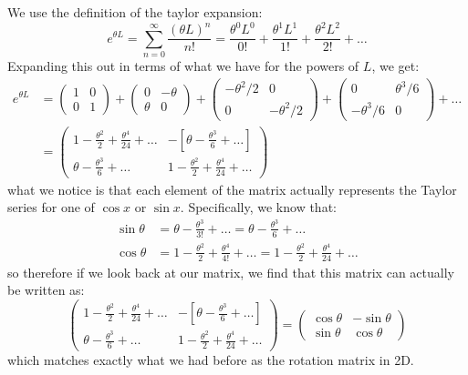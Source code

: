 \documentclass{article}
\begin{document}
\begin{solution}
	We use the definition of the taylor expansion:
	\[
		e^{\theta L} = \sum_{n=0}^\infty \frac{(\theta L)^n}{n!} = \frac{\theta^0 L^0}{0!} + \frac{\theta^1 L^1}{1!} + \frac{\theta^2L^2}{2!} + \dots
	\] 
	Expanding this out in terms of what we have for the powers of $L$, we get:
	\begin{align*}
		e^{\theta L} &= \begin{pmatrix} 1 & 0\\0&1 \end{pmatrix} + 
		\begin{pmatrix} 0 & -\theta \\ \theta & 0 \end{pmatrix} +
		\begin{pmatrix} -\theta^2 / 2 & 0 \\ 0 & -\theta ^2/2 \end{pmatrix} +
		\begin{pmatrix} 0 & \theta^3 /6\\ - \theta^3 /6 & 0 \end{pmatrix} + \dots\\
						  &= \begin{pmatrix} 1 - \frac{\theta^2}{2} + \frac{\theta^4}{24} + \dots & -\left[\theta - \frac{\theta^3}{6} + \dots \right]\\ \theta - \frac{\theta^3}{6} + \dots & 1 - \frac{\theta^2}{2} + \frac{\theta^4}{24} + \dots \end{pmatrix} 
	\end{align*} 
	what we notice is that each element of the matrix actually represents the Taylor series for one of $\cos x$
	or $\sin x$. Specifically, we know that: 
	\begin{align*}
		\sin \theta &= \theta - \frac{\theta^3}{3!} + \dots = \theta - \frac{\theta^3}{6} + \dots\\
		\cos \theta &= 1 - \frac{\theta^2}{2} + \frac{\theta^4}{4!} + \dots = 1 - \frac{\theta^2}{2} + \frac{\theta^4}{24} + \dots
	\end{align*} 
	so therefore if we look back at our matrix, we find that this matrix can actually be written as:
	\[
		\begin{pmatrix} 1 - \frac{\theta^2}{2} + \frac{\theta^4}{24} + \dots & -\left[\theta - \frac{\theta^3}{6} + \dots \right]\\ \theta - \frac{\theta^3}{6} + \dots & 1 - \frac{\theta^2}{2} + \frac{\theta^4}{24} + \dots \end{pmatrix} = \begin{pmatrix} \cos \theta & - \sin \theta\\ \sin \theta & \cos \theta   \end{pmatrix} 
	\] 
	which matches exactly what we had before as the rotation matrix in 2D. 
\end{solution}
\end{document}
